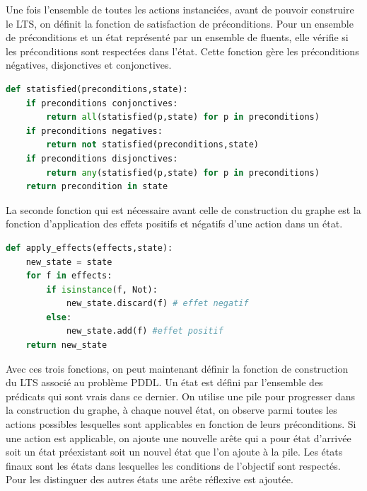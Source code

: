 Une fois l'ensemble de toutes les actions instanciées, avant de pouvoir construire le LTS, on définit la fonction de satisfaction de préconditions. Pour un ensemble de préconditions et un état représenté par un ensemble de fluents, elle vérifie si les préconditions sont respectées dans l'état. Cette fonction gère les préconditions négatives, disjonctives et conjonctives.

\hfill
\begin{lstlisting}[language=Python, basicstyle=\small\ttfamily,
                   commentstyle=\color{gray}\itshape,
                   keywordstyle=\bfseries]
def statisfied(preconditions,state):
    if preconditions conjonctives:
        return all(statisfied(p,state) for p in preconditions)
    if preconditions negatives:
        return not statisfied(preconditions,state)
    if preconditions disjonctives:
        return any(statisfied(p,state) for p in preconditions)
    return precondition in state

\end{lstlisting}
\hfill

La seconde fonction qui est nécessaire avant celle de construction du graphe est la fonction d'application des effets positifs et négatifs d'une action dans un état.
\hfill

\begin{lstlisting}[language=Python, basicstyle=\small\ttfamily,
                   commentstyle=\color{gray}\itshape,
                   keywordstyle=\bfseries]
def apply_effects(effects,state):
    new_state = state
    for f in effects:
        if isinstance(f, Not):
            new_state.discard(f) # effet negatif
        else:
            new_state.add(f) #effet positif
    return new_state

\end{lstlisting}
\hfill

Avec ces trois fonctions, on peut maintenant définir la fonction de construction du LTS associé au problème PDDL. Un état est défini par l'ensemble des prédicats qui sont vrais dans ce dernier. On utilise une pile pour progresser dans la construction du graphe, à chaque nouvel état, on observe parmi toutes les actions possibles lesquelles sont applicables en fonction de leurs préconditions. Si une action est applicable, on ajoute une nouvelle arête qui a pour état d'arrivée soit un état préexistant soit un nouvel état que l'on ajoute à la pile. Les états finaux sont les états dans lesquelles les conditions de l'objectif sont respectés. Pour les distinguer des autres états une arête réflexive est ajoutée. 

